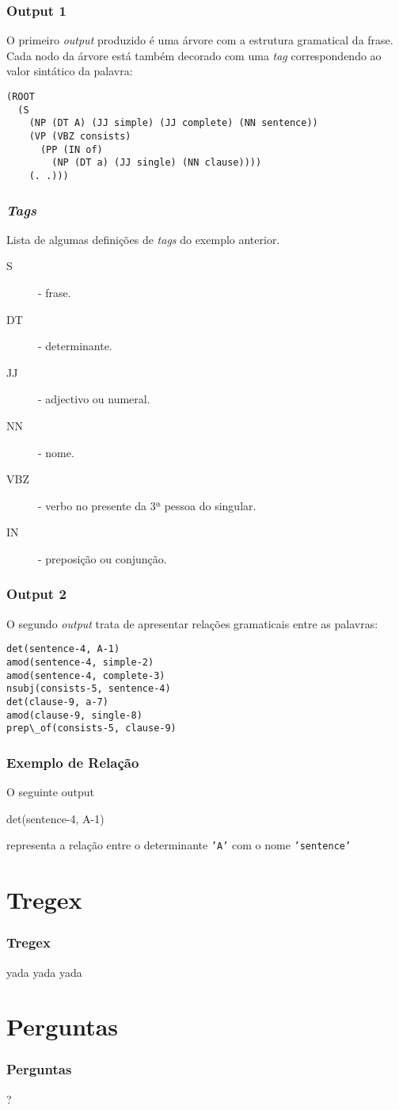 \documentclass{beamer}
\begin{document}
\begin{frame}[fragile]\frametitle{Output 1}
O primeiro \emph{output} produzido é uma árvore com a estrutura gramatical da frase. Cada nodo da árvore está também decorado com
uma \emph{tag} correspondendo ao valor sintático da palavra:

\begin{lstlisting}[language=perl_u,breaklines=true]
 (ROOT
  (S
    (NP (DT A) (JJ simple) (JJ complete) (NN sentence))
    (VP (VBZ consists)
      (PP (IN of)
        (NP (DT a) (JJ single) (NN clause))))
    (. .)))
\end{lstlisting}

\end{frame}

\begin{frame}\frametitle{\emph{Tags}}
Lista de algumas definições de \emph{tags} do exemplo anterior.\\
 \begin{description}
  \item [S] - frase.
  \item [DT] - determinante.
  \item [JJ] - adjectivo ou numeral.
  \item [NN] - nome.
  \item [VBZ] - verbo no presente da 3ª pessoa do singular.
  \item [IN] - preposição ou conjunção.
 \end{description}
\end{frame}

\begin{frame}[fragile]\frametitle{Output 2}
 O segundo \emph{output} trata de apresentar relações gramaticais entre as palavras:
\begin{lstlisting}[language=perl_u,breaklines=true]
det(sentence-4, A-1)
amod(sentence-4, simple-2)
amod(sentence-4, complete-3)
nsubj(consists-5, sentence-4)
det(clause-9, a-7)
amod(clause-9, single-8)
prep\_of(consists-5, clause-9)
\end{lstlisting}

\end{frame}

\begin{frame}\frametitle{Exemplo de Relação}
  O seguinte output
 \begin{block}{}
  det(sentence-4, A-1)
 \end{block}
  representa a relação entre o determinante \texttt{'A'} com o nome \texttt{'sentence'}

\end{frame}

\section{Tregex}
\begin{frame}\frametitle{Tregex}
 yada yada yada
\end{frame}


\section*{Perguntas}
\begin{frame} \frametitle{Perguntas}
\begin{center}\huge{?}\end{center}
\end{frame}
\end{document}
